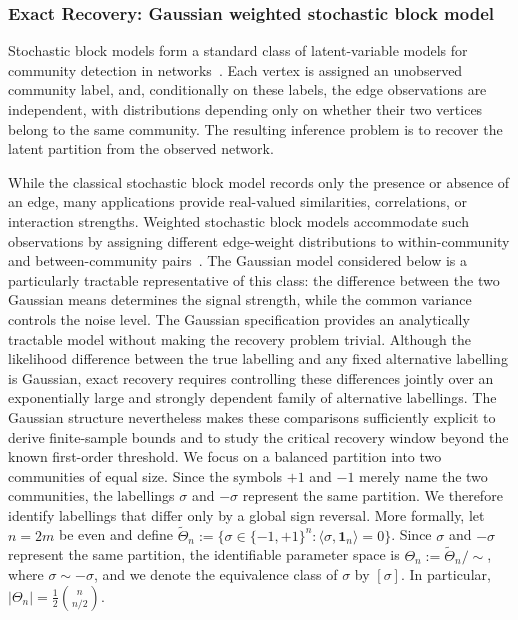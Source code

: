 \documentclass[11pt]{article}
\theoremstyle{definition}
\theoremstyle{remark}
\newcommand{\1}{\boldsymbol{1}}
\begin{document}
\subsubsection{Exact Recovery: Gaussian weighted stochastic block model}
\label{sec:gaussian-weighted-sbm}
Stochastic block models form a standard class of latent-variable models for
community detection in networks~\cite{HollandLaskeyLeinhardt1983}. Each vertex is assigned an unobserved
community label, and, conditionally on these labels, the edge observations
are independent, with distributions depending only on whether their
two vertices belong to the same community. The resulting inference problem is
to recover the latent partition from the observed network.

While the classical stochastic block model records only the presence or
absence of an edge, many applications provide real-valued similarities,
correlations, or interaction strengths. Weighted stochastic block models
accommodate such observations by assigning different edge-weight
distributions to within-community and between-community pairs~\cite{AicherJacobsClauset2015}. The Gaussian
model considered below is a particularly tractable representative of this
class: the difference between the two Gaussian means determines the signal
strength, while the common variance controls the noise level. The Gaussian specification provides an analytically tractable model without making the recovery problem trivial. Although the likelihood difference between the true labelling and any fixed alternative labelling is Gaussian, exact recovery requires controlling these differences jointly over an exponentially large and strongly dependent family of alternative labellings. The Gaussian structure nevertheless makes these comparisons sufficiently explicit to derive finite-sample bounds and to study the critical recovery window beyond the known first-order threshold.
We focus on a balanced partition into two communities of equal size. Since the symbols \(+1\) and \(-1\) merely name the two communities, the labellings \(\sigma\) and \(-\sigma\) represent the same partition. We therefore identify labellings that differ only by a global sign
reversal. More formally, let $n=2m$ be even and define
\(\widetilde\Theta_n:=\{\sigma\in\{-1,+1\}^n:
\langle\sigma,\mathbf 1_n\rangle=0\}\).
Since $\sigma$ and $-\sigma$ represent the same partition, the
identifiable parameter space is
\(\Theta_n:=\widetilde\Theta_n/\!\sim\), where \(\sigma\sim-\sigma\),
and we denote the equivalence class of $\sigma$ by $[\sigma]$. In
particular, \(|\Theta_n|=\frac12\binom{n}{n/2}\).
\end{document}
